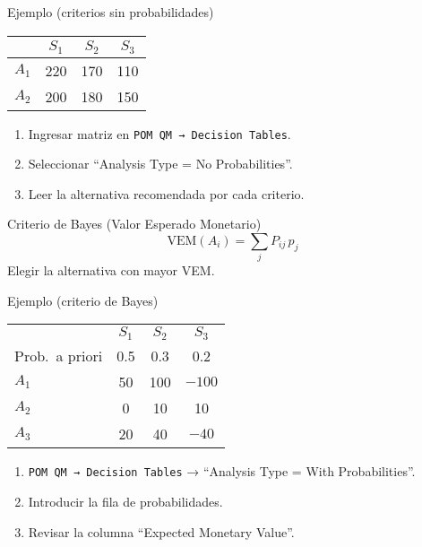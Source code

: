 \documentclass{beamer}
\begin{document}
\begin{frame}{Ejemplo (criterios sin probabilidades)}
  \begin{table}\centering
    \begin{tabular}{lccc}
      \toprule
      & $S_1$ & $S_2$ & $S_3$\\ \midrule
      $A_1$ & 220 & 170 & 110\\
      $A_2$ & 200 & 180 & 150\\ \bottomrule
    \end{tabular}
  \end{table}
  \begin{enumerate}\footnotesize
    \item Ingresar matriz en \texttt{POM QM → Decision Tables}.
    \item Seleccionar “Analysis Type = No Probabilities”.
    \item Leer la alternativa recomendada por cada criterio.
  \end{enumerate}
\end{frame}

\begin{frame}{Criterio de Bayes (Valor Esperado Monetario)}
  \[
    \text{VEM}(A_i)=\sum_{j} P_{ij}\,p_j
  \]
  Elegir la alternativa con mayor VEM.
\end{frame}

\begin{frame}{Ejemplo (criterio de Bayes)}
  \begin{table}\centering
    \begin{tabular}{lccc}
      \toprule
      & $S_1$ & $S_2$ & $S_3$\\
      Prob.\ a priori & 0.5 & 0.3 & 0.2\\ \midrule
      $A_1$ & 50 & 100 & $-100$\\
      $A_2$ & 0 & 10 & 10\\
      $A_3$ & 20 & 40 & $-40$\\ \bottomrule
    \end{tabular}
  \end{table}
  \begin{enumerate}\footnotesize
    \item \texttt{POM QM → Decision Tables} → “Analysis Type = With Probabilities”.
    \item Introducir la fila de probabilidades.
    \item Revisar la columna “Expected Monetary Value”.
  \end{enumerate}
\end{frame}
\end{document}
